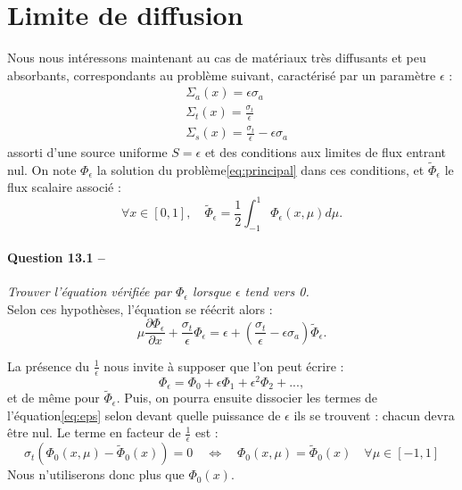 \documentclass[11pt,a4paper]{article}
\newcommand{\question}[2]{\paragraph{Question #1 --}\hspace{-7pt}\textit{#2} \\}
\newcommand{\Phit}{\widetilde{\Phi}}
\begin{document}
 \section{Limite de diffusion}
 
 Nous nous intéressons maintenant au cas de matériaux très diffusants et peu absorbants, correspondants au problème suivant, caractérisé par un paramètre $\epsilon$ :
 \begin{equation}
  \begin{align}
   &\Sigma_a(x) = \epsilon \sigma_a\\
   &\Sigma_t(x) = \frac{\sigma_t}{\epsilon}\\
   &\Sigma_s(x) = \frac{\sigma_t}{\epsilon} - \epsilon \sigma_a
  \end{align}
 \end{equation}
 assorti d'une source uniforme $S = \epsilon$ et des conditions aux limites de flux entrant nul.
 On note $\Phi_\epsilon$ la solution du problème\ref{eq:principal} dans ces conditions, et $\Phit_\epsilon$ le flux scalaire associé :
 \begin{equation}
  \forall x\in [0,1], \quad \Phit_\epsilon = \frac{1}{2} \int_{-1}^1 \Phi_\epsilon(x,\mu) d\mu .
 \end{equation}
 
\question{13.1}{Trouver l'équation vérifiée par $\Phi_\epsilon$ lorsque $\epsilon$ tend vers 0.}

Selon ces hypothèses, l'équation se réécrit alors :
\begin{equation}
 \mu \frac{\partial \Phi_\epsilon}{\partial x} + \frac{\sigma_t}{\epsilon} \Phi_\epsilon =  \epsilon + \left(\frac{\sigma_t}{\epsilon} - \epsilon \sigma_a\right) \Phit_\epsilon .
 \label{eq:eps}
\end{equation}

La présence du $\frac{1}{\epsilon}$ nous invite à supposer que l'on peut écrire :
\begin{equation}
 \Phi_\epsilon = \Phi_0 + \epsilon\Phi_1 + \epsilon^2 \Phi_2 + ... ,
\end{equation}
et de même pour $\Phit_\epsilon$.
Puis, on pourra ensuite dissocier les termes de l'équation\ref{eq:eps} selon devant quelle puissance de $\epsilon$ ils se trouvent : chacun devra être nul.
Le terme en facteur de $\frac{1}{\epsilon}$ est :
\begin{equation}
 \sigma_t (\Phi_0(x,\mu) - \Phit_0(x)) = 0 \quad \Leftrightarrow \quad \Phi_0(x,\mu) = \Phit_0(x) \quad \forall \mu \in [-1,1]
\end{equation}
Nous n'utiliserons donc plus que $\Phi_0(x)$.
\end{document}
